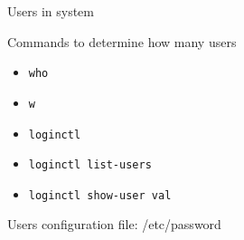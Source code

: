 \begin{frame}[fragile]{Users in system}

Commands to determine how many users
  \begin{itemize}
    \item \verb|who|
    \item \verb|w|
    \item \verb|loginctl|
    \item \verb|loginctl list-users|
    \item \verb|loginctl show-user val|
  \end{itemize}
Users configuration file:  \alert{/etc/password}
\end{frame}